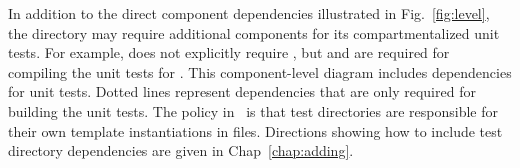 In addition to the direct component dependencies illustrated in
Fig.~\ref{fig:level}, the  directory may
require additional components for its compartmentalized unit tests.  For example,
 does not explicitly require , but  and  are required for compiling the unit tests for .  This component-level diagram includes  dependencies for unit tests.  Dotted lines represent dependencies that are only required for building the unit tests.  
The policy in \draco\ is that
test directories are responsible for their own template instantiations in  files.
Directions showing how to include test directory dependencies are given in Chap~\ref{chap:adding}. 

